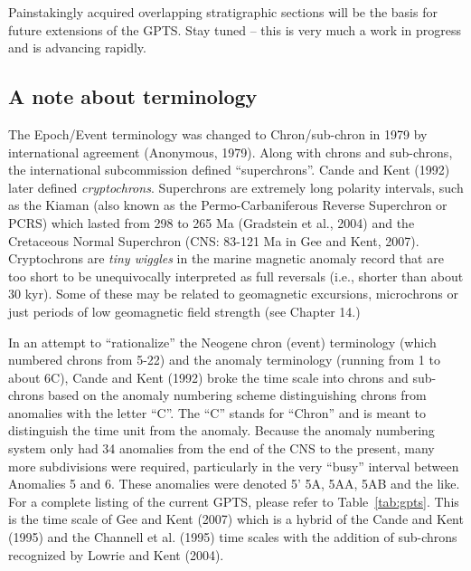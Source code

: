 Painstakingly acquired overlapping stratigraphic sections will be the basis for future extensions  of the GPTS.  Stay tuned -- this is very much a work in progress and is advancing rapidly.    




\subsection{ A note about terminology}

The Epoch/Event terminology was changed to Chron/sub-chron in 1979 by international agreement (Anonymous, 1979).  \nocite{anonymous79}  Along with chrons and sub-chrons, the international subcommission defined ``superchrons''.  
Cande and Kent (1992) later defined  \nocite{cande92} 
{\it cryptochrons}.  Superchrons are extremely long polarity intervals, such as the Kiaman (also known as the  
Permo-Carbaniferous Reverse Superchron or PCRS) which lasted from 298 to 265 Ma 
(Gradstein et al., 2004) and the \nocite{gradstein04} Cretaceous Normal Superchron (CNS: 83-121 Ma in 
Gee and Kent, 2007). \nocite{gee07}   
Cryptochrons are 
{\it tiny wiggles} in the marine magnetic anomaly record that are too short to be unequivocally interpreted as full reversals (i.e., shorter than about 30 kyr).  Some of these may be related to geomagnetic excursions, microchrons  or just periods of low geomagnetic field strength (see Chapter 14.)     

In an attempt to ``rationalize'' the Neogene chron (event) terminology (which numbered chrons from 5-22) and the anomaly terminology (running from 1 to about 6C),  
Cande and Kent (1992) \nocite{cande92}  broke the time scale into chrons and sub-chrons based on the anomaly numbering scheme distinguishing chrons from anomalies with the letter ``C''.     The ``C'' stands for ``Chron'' and is meant to distinguish the time unit from the anomaly.   Because the anomaly numbering system only had 34 anomalies from the end of the CNS to the present, many more subdivisions were required, particularly in the very ``busy'' interval between Anomalies 5 and 6.  These anomalies were denoted 5' 5A, 5AA, 5AB and the like.   
For a complete listing of the current GPTS, please refer to Table~\ref{tab:gpts}.     This is the time scale of
 Gee and Kent (2007) which is a hybrid of the Cande and Kent (1995) and the 
 Channell et al. (1995) time scales with the addition of sub-chrons  recognized by 
 \nocite{lowrie04}
 Lowrie and Kent (2004). 

